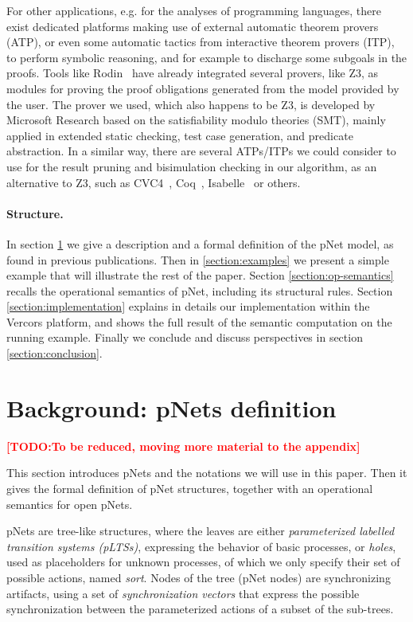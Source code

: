 \documentclass{lncs/llncs}
\newcommand{\TODO}[1]{\textcolor{red}{\textbf{[TODO:#1]}}}
\begin{document}
For other applications, e.g. for the analyses of 
programming languages, there exist dedicated platforms making use of
external automatic theorem 
provers (ATP), or even some automatic tactics from interactive theorem
provers (ITP), to perform symbolic reasoning, and for example to
discharge some subgoals in the proofs.
Tools like Rodin~\cite{deharbe2013,deharbe2014,abrial2007} have
already integrated several provers, like Z3, as modules for proving
the proof obligations generated from the model provided by the user. 
The prover we used, which also happens to be Z3, is developed by Microsoft Research
based on the satisfiability modulo 
theories (SMT), mainly applied in extended static checking, test case
generation, and predicate abstraction.
In a similar way, there are several ATPs/ITPs we could consider to use for
the result pruning and bisimulation checking in our algorithm, as an
alternative to Z3, such as CVC4~\cite{barrett:CAV2011},
Coq~\cite{armand:CPP2011},
Isabelle~\cite{blanchette:FroCoS2011} or others. 


\paragraph{Structure.}
In section
\ref{section:pnets} we give a description and a formal definition of
the pNet model, as found in previous publications. Then in
\ref{section:examples} we present a simple example that will
illustrate the rest of the paper.
Section \ref{section:op-semantics} recalls the operational semantics
of pNet, including its structural rules.
Section \ref{section:implementation} explains in details our
implementation within the Vercors platform, and shows the full result of
the semantic computation on the running example.
Finally we conclude and discuss perspectives in section
\ref{section:conclusion}. 




\section{Background: pNets definition}
\label{section:pnets}

\TODO{To be reduced, moving more material to the appendix}
  
This section introduces pNets and the notations we will use in
this paper. Then it gives the formal definition of pNet structures,
together with an operational semantics for open pNets.

pNets are tree-like structures, where the leaves are either
\emph{parameterized labelled transition systems (pLTSs)}, expressing the
behavior of basic processes, or \emph{holes}, used as placeholders
for unknown processes, of which we only specify their set of possible
actions, named \emph{sort}.
Nodes of the tree (pNet nodes) are synchronizing artifacts, using a
set of \emph{synchronization vectors} that express the possible
synchronization between the parameterized actions of a subset of the
sub-trees.
\end{document}
